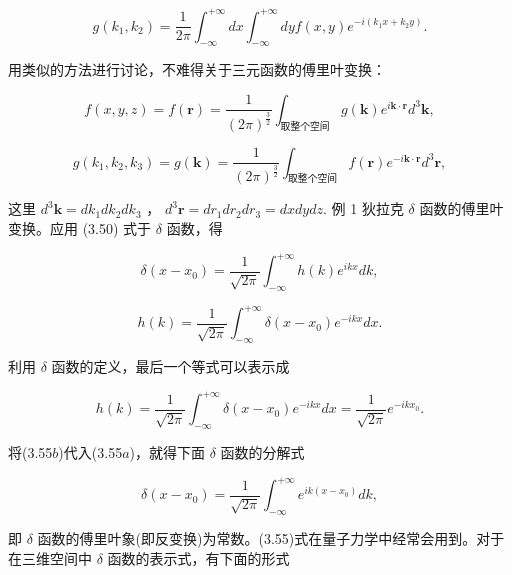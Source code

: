 \begin{equation*}
g (k _ {1}, k _ {2}) = \frac {1}{2 \pi} \int_ {- \infty} ^ {+ \infty} d x \int_ {- \infty} ^ {+ \infty} d y f (x, y) e ^ {- i (k _ {1} x + k _ {2} y)}.\tag{3.53b}
\end{equation*}

用类似的方法进行讨论，不难得关于三元函数的傅里叶变换：

\begin{equation*}
f (x, y, z) = f (\pmb {r}) = \frac {1}{(2 \pi) ^ {\frac {3}{2}}} \int_ {\text {取整个空间}} g (\pmb {k}) e ^ {i \pmb {k} \cdot \pmb {r}} d ^ {3} \pmb {k},\tag{3.54a}
\end{equation*}

\begin{equation*}
g (k _ {1}, k _ {2}, k _ {3}) = g (\pmb {k}) = \frac {1}{(2 \pi) ^ {\frac {3}{2}}} \int_ {\text {取整个空间}} f (\pmb {r}) e ^ {- i \pmb {k} \cdot \pmb {r}} d ^ {3} \pmb {r},\tag{3.54b}
\end{equation*}

这里 $d^3\pmb {k} = dk_1dk_2dk_3$ ， $d^3\pmb {r} = dr_1dr_2dr_3 = dxdydz.$ 例 1 狄拉克 $\delta$ 函数的傅里叶变换。应用 (3.50) 式于 $\delta$ 函数，得

\begin{equation*}
\delta (x - x _ {0}) = \frac {1}{\sqrt {2 \pi}} \int_ {- \infty} ^ {+ \infty} h (k) e ^ {i k x} d k, \tag{3.55a}
\end{equation*}

\begin{equation*}
h (k) = \frac {1}{\sqrt {2 \pi}} \int_ {- \infty} ^ {+ \infty} \delta (x - x _ {0}) e ^ {- i k x} d x.
\end{equation*}

利用 $\delta$ 函数的定义，最后一个等式可以表示成

\begin{equation*}
h (k) = \frac {1}{\sqrt {2 \pi}} \int_ {- \infty} ^ {+ \infty} \delta (x - x _ {0}) e ^ {- i k x} d x = \frac {1}{\sqrt {2 \pi}} e ^ {- i k x _ {0}}.\tag{3.55b}
\end{equation*}

将(3.55$b$)代入(3.55$a$)，就得下面 $\delta$ 函数的分解式

\begin{equation*}
\delta (x - x _ {0}) = \frac {1}{\sqrt {2 \pi}} \int_ {- \infty} ^ {+ \infty} e ^ {i k (x - x _ {0})} d k,\tag{3.55}
\end{equation*}

即 $\delta$ 函数的傅里叶象(即反变换)为常数。(3.55)式在量子力学中经常会用到。对于在三维空间中 $\delta$ 函数的表示式，有下面的形式

